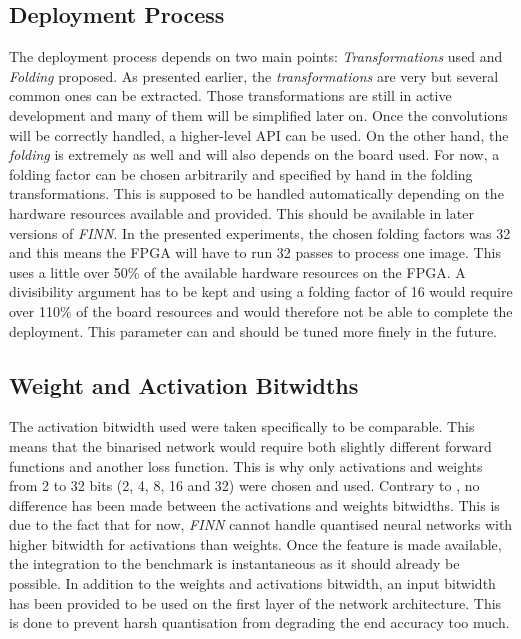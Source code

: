 
\subsection{Deployment Process}

The deployment process depends on two main points: \emph{Transformations} used and \emph{Folding} proposed. As presented earlier, the \emph{transformations} are very  but several common ones can be extracted. Those transformations are still in active development and many of them will be simplified later on. Once the convolutions will be correctly handled, a higher-level API can be used. On the other hand, the \emph{folding} is extremely  as well and will also depends on the board used. For now, a folding factor can be chosen arbitrarily and specified by hand in the folding transformations. This is supposed to be handled automatically depending on the hardware resources available and provided. This should be available in later versions of \emph{FINN}. In the presented experiments, the chosen folding factors was 32 and this means the FPGA will have to run 32 passes to process one image. This uses a little over 50\% of the available hardware resources on the FPGA. A divisibility argument has to be kept and using a folding factor of 16 would require over 110\% of the board resources and would therefore not be able to complete the deployment. This parameter can and should be tuned more finely in the future.


\subsection{Weight and Activation Bitwidths}

The activation bitwidth used were taken specifically to be comparable. This means that the binarised network would require both slightly different forward functions and another loss function. This is why only activations and weights from 2 to 32 bits (2, 4, 8, 16 and 32) were chosen and used. Contrary to \cite{Bacchus2020}, no difference has been made between the activations and weights bitwidths. This is due to the fact that for now, \emph{FINN} cannot handle quantised neural networks with higher bitwidth for activations than weights. Once the feature is made available, the integration to the benchmark is instantaneous as it should already be possible. In addition to the weights and activations bitwidth, an input bitwidth has been provided to be used on the first layer of the network architecture. This is done to prevent harsh quantisation from degrading the end accuracy too much.

